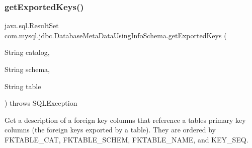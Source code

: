 \subsubsection{\texorpdfstring{get\+Exported\+Keys()}{getExportedKeys()}}
{\footnotesize\ttfamily java.\+sql.\+Result\+Set com.\+mysql.\+jdbc.\+Database\+Meta\+Data\+Using\+Info\+Schema.\+get\+Exported\+Keys (\begin{DoxyParamCaption}\item[{String}]{catalog,  }\item[{String}]{schema,  }\item[{String}]{table }\end{DoxyParamCaption}) throws S\+Q\+L\+Exception}

Get a description of a foreign key columns that reference a table\textquotesingle{}s primary key columns (the foreign keys exported by a table). They are ordered by F\+K\+T\+A\+B\+L\+E\+\_\+\+C\+AT, F\+K\+T\+A\+B\+L\+E\+\_\+\+S\+C\+H\+EM, F\+K\+T\+A\+B\+L\+E\+\_\+\+N\+A\+ME, and K\+E\+Y\+\_\+\+S\+EQ. 

